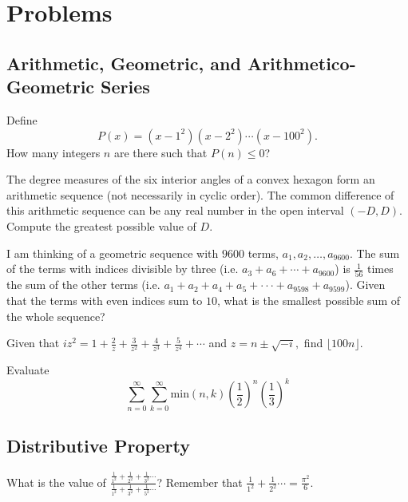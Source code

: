 \documentclass[11pt]{article}
\begin{document}
\pagebreak

\section{Problems}



\subsection{Arithmetic, Geometric, and Arithmetico-Geometric Series}

\begin{prob}[2020 AMC 10A/17]{1}
Define $$P(x) =(x-1^2)(x-2^2)\cdots(x-100^2).$$How many integers $n$ are there such that $P(n)\leq 0$?
\end{prob}

\begin{prob}{2}
The degree measures of the six interior angles of a convex hexagon form
an arithmetic sequence (not necessarily in cyclic order). The common
difference of this arithmetic sequence can be any real number in the
open interval $(-D, D)$. Compute the greatest possible value of $D$.
\end{prob}

\begin{prob}[NEMO 2017]{2}
I am thinking of a geometric sequence with $9600$ terms, $a_1, a_2, \ldots, a_{9600}$. The sum of the terms with indices divisible by three (i.e. $a_3 + a_6 + \cdots + a_{9600}$) is $\frac{1}{56}$ times the sum of the other terms (i.e. $a_1 + a_2 + a_4 + a_5 + · · · + a_{9598} + a_{9599}$). Given that the terms with even indices sum to $10$, what is the
smallest possible sum of the whole sequence?
\end{prob}

\begin{req}{4}
Given that $ iz^2=1+\frac 2z + \frac{3}{z^2}+\frac{4}{z ^3}+\frac{5}{z^4}+\cdots$ and $z=n\pm \sqrt{-i},$ find $ \lfloor 100n \rfloor$.
\end{req}

\begin{prob}[BMT 2014]{4}
Evaluate
$$\sum_{n=0}^{\infty} \sum_{k=0}^{\infty} \text{min}(n,k)(\frac{1}{2})^{n}(\frac{1}{3})^{k}$$
\end{prob}
\subsection{Distributive Property}
\begin{prob}{2}

What is the value of $\frac{\frac{1}{1^2}+\frac{1}{2^2}+\frac{1}{3^2} \cdots}{\frac{1}{1^2}+\frac{1}{3^2}+\frac{1}{5^2}\cdots}$?
Remember that $\frac{1}{1^2}+\frac{1}{2^2}\cdots = \frac{\pi^2}{6}$.
\end{prob}
\end{document}

